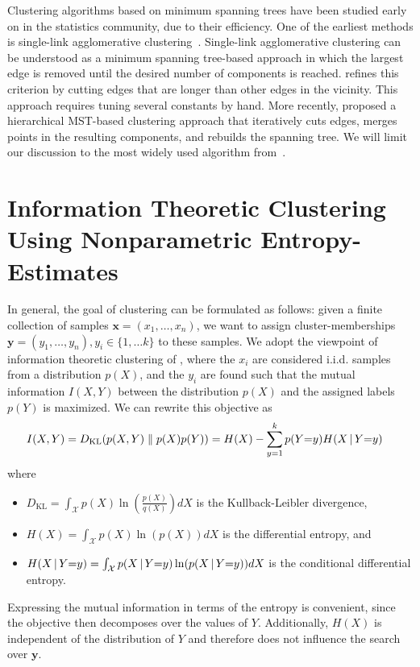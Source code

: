 Clustering algorithms based on minimum spanning trees have been studied early
on in the statistics community, due to their efficiency.  One of the earliest
methods is single-link agglomerative clustering~\citep{gower1969minimum}.
Single-link agglomerative clustering can be understood as a minimum spanning
tree-based approach in which the largest edge is removed until the desired
number of components is reached.  \citet{zahn1971graph} refines this criterion
by cutting edges that are longer than other edges in the vicinity. This
approach requires tuning several constants by hand. More recently,
\citet{grygorash2006minimum} proposed a hierarchical MST-based clustering
approach that iteratively cuts edges, merges points in the resulting
components, and rebuilds the spanning tree.
We will limit our discussion to the most widely used algorithm from~\citep{gower1969minimum}.
%
\section{Information Theoretic Clustering Using Nonparametric Entropy-Estimates}
In general, the goal of clustering can be formulated as follows: 
given a finite collection of samples $\mathbf{x} = (x_1, \dotsc, x_n)$, we want to 
assign cluster-memberships $\mathbf{y} = (y_1, \dotsc, y_n ), y_i \in \{1, \dotsc k\}$ to these samples.
%
We adopt the viewpoint of information theoretic clustering of \citet{gokcay2002information}, 
where the $x_i$ are considered i.i.d{.} samples from a distribution $p(X)$, and the 
$y_i$ are found such that the mutual information $I(X, Y)$ between the distribution $p(X)$ and the
assigned labels $p(Y)$ is maximized.
We can rewrite this objective as 
\begin{align}
         I(X, Y)
        &= D_{\text{KL}}(p(X, Y) \parallel p(X) p(Y)) = H(X) - \sum_{y=1}^k p(Y{=}y) H(X \, | \, Y {=} y)
\end{align}
where
\begin{itemize}
\item $D_\text{KL} = \int_\mathcal{X} p(X) \ln(\frac{p(X)}{q(X)})dX$ is the Kullback-Leibler divergence,
\item $H(X) = \int_\mathcal{X} p(X) \ln(p(X))dX$ is the differential entropy, and
\item $H(X \, | \, Y{=}y) = \int_\mathcal{X} p(X \, | \, Y {=}y) \ln(p(X \, | \, Y {=} y))dX$ is the conditional differential entropy.
    \end{itemize}
Expressing the mutual information in terms of the entropy is convenient, since
the objective then decomposes over the values of $Y$. 
%
Additionally, $H(X)$ is independent of the distribution of $Y$ and therefore
does not influence the search over $\mathbf{y}$.


